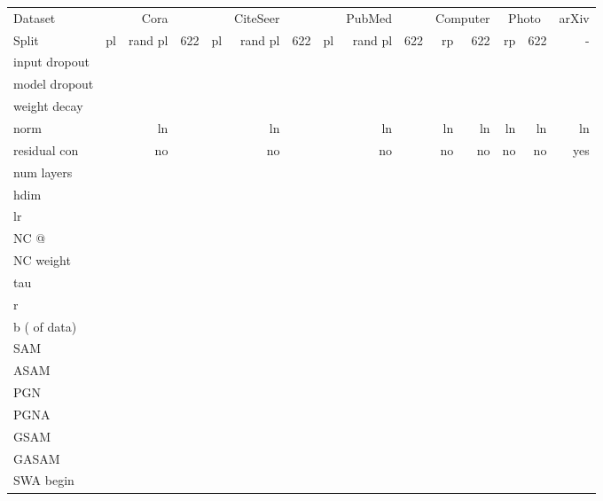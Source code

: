 \documentclass[runningheads]{llncs}
\newcommand{\GraphMLP}{Graph-MLP\xspace}
\begin{document}
\begin{table*}[!ht]
    \centering  
    \caption{Optimal hyperparameter values for \GraphMLP on transductive tasks.}
    \label{tab:gmlp_params}
    \tiny
    \begin{tabular}{l|r r r | r r r | r r r | r r | r r | r }\toprule
    Dataset       & & Cora & & & CiteSeer & & & PubMed & & \multicolumn{2}{c|}{Computer} & \multicolumn{2}{c|}{Photo} & arXiv \\
    Split         & pl & rand pl & 622 & pl & rand pl & 622 & pl & rand pl & 622 & rp & 622 & rp & 622 &- \\ \midrule
    input dropout & &  & & &  & & &  & &  &  &  &  &   \\
    model dropout &  &  &  &  &  &  &  &  &  &  &  &  &  &   \\
    weight decay  &  &  &  &  &  &  &  &  &  &  &  &  &  &   \\
    norm          & & ln & & & ln & & & ln & & ln & ln & ln & ln & ln  \\
    residual con           & & no & & & no &  & & no & & no & no & no & no & yes \\
    num layers    & &  & & &  & & &  & &  &  &  &  &  \\
    hdim          & &  & & &  & & &  & &  &  &  &  &  \\
    lr            &  &  &  &  &  &  &  &  &  &  &  &  &  &   \\
    NC @          &  &  &  & &  & & &  & &  &  &  &  &  \\
    NC weight     &  &  &  & &  & & &  & &  &  &  &  &  \\
    tau           &  &  &  &  &  &  &  &  &  &  &  &  &  &  \\
    r             & &  & & &  & & &  & &  &  &  &  &   \\
    b ( of data)& &  & & &  & & &  & &  &  &  &  &  \\ \midrule
    SAM        &  &  &  &     &  &  &  &  &  &  &  &  &  &   \\
    ASAM       &    &    &    &  &  &    &  &    &  &  &  &  &  &   \\
    PGN    &  &  &  &   &  &   &   &  &  &  &  &  &  &   \\
    PGNA    &  &  &  & &  & &   &  &   &  &  &  &  &   \\
    GSAM    &  &  &  &  &  &  &   &  &   &  &  &  &  &   \\
    GASAM   &  &  &  &  &  &   &   &  &   &  &  &  &  &   \\
    SWA begin     &  &  &  &  &  &  &  &  &  &  &  &  &  &  \\

\end{tabular}
\end{table*}
\end{document}

